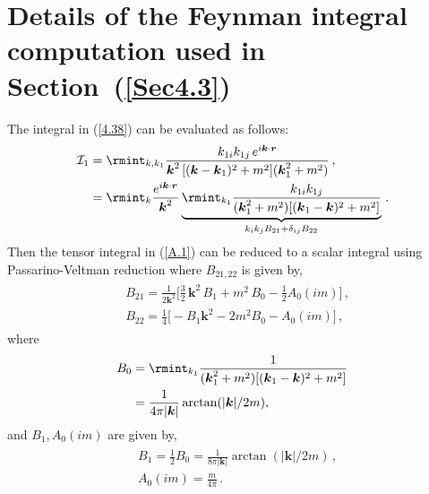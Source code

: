 \section{ Details of the Feynman integral computation  used in Section~(\ref{Sec4.3})}\label{ch1:app:B}
The integral in (\ref{4.38}) can be evaluated as follows:
\begin{align}
    \begin{split}
         \mathcal{I}_1&= \rmint_{k,k_1}\frac{k_{1i}k_{1j}\,e^{i\boldsymbol{k}\cdot \boldsymbol{r}}}{\boldsymbol{k}^2\,[(\boldsymbol{k}-\boldsymbol{k}_1)^2+m^2](\boldsymbol{k}_{1}^2+m^2)}\,,\\ &
         =\rmint_{k}\frac{e^{i\boldsymbol{k}\cdot \boldsymbol{r}}}{\boldsymbol{k}^2}\underbrace{\rmint_{k_1}\frac{k_{1i}k_{1j}}{(\boldsymbol{k}_1^2+m^2)[(\boldsymbol{k}_1-\boldsymbol{k})^2+m^2]}}_{k_i k_j B_{21}+\delta_{ij}B_{22}}\,.\label{A.1}
    \end{split}
\end{align}
Then the tensor integral in (\ref{A.1}) can be reduced to a scalar integral using Passarino-Veltman reduction \cite{Passarino:1978jh,2022arXiv220103593W} where $B_{21,22}$ is given by,
 \begin{align}
     \begin{split}
          & B_{21}=\frac{1}{2\boldsymbol{k}^2}\Big[\frac{3}{2}\,\boldsymbol{k}^2\,B_{1}+m^2\,B_0-\frac{1}{2}A_0(im)\Big]\,,\\ &
          B_{22}=\frac{1}{4}\Big[-B_1\boldsymbol{k}^2-2m^2B_{0}-A_{0}(im)\Big]\,,
     \end{split}
 \end{align}
 where
 \begin{align}
     \begin{split}
      B_{0}&=\rmint_{k_1}\frac{1}{(\boldsymbol{k}_1^2+m^2)[(\boldsymbol{k}_1-\boldsymbol{k})^2+m^2]}\\ &
      =\frac{1}{4\pi|\boldsymbol{k}|}\arctan(|\boldsymbol{k}|/2m),
    \label{A.3}
     \end{split}
 \end{align}
 and $B_1,A_0(im)$ are given by,
 \begin{align}
     \begin{split}
           &  B_1=\frac{1}{2}B_0=\frac{1}{8\pi|\boldsymbol{k}|}\arctan(|\boldsymbol{k}|/2m)\,,\\ &
       A_0(im)=\frac{m}{4\pi}\,.
     \end{split}
 \end{align}

